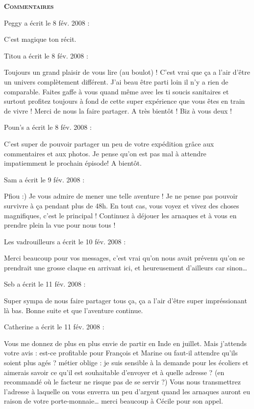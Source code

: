 \bigskip
\textbf{\textsc{Commentaires}}

\medskip
Peggy a écrit le 8 fév. 2008 :
\begin{displayquote}
C'est magique ton récit.
\end{displayquote}

\medskip
Titou a écrit le 8 fév. 2008 :
\begin{displayquote}
Toujours un grand plaisir de vous lire (au boulot) ! C'est vrai que ça a l'air d'être un univers complètement différent. J'ai beau être parti loin il n'y a rien de comparable. Faites gaffe à vous quand même avec les ti soucis sanitaires et surtout profitez toujours à fond de cette super expérience que vous êtes en train de vivre ! Merci de nous la faire partager. A très bientôt ! Biz à vous deux !
\end{displayquote}

\medskip
Poun's a écrit le 8 fév. 2008 :
\begin{displayquote}
C'est super de pouvoir partager un peu de votre expédition grâce aux commentaires et aux photos. Je pense qu'on est pas mal à attendre impatiemment le prochain épisode!
A bientôt.
\end{displayquote}

\medskip
Sam a écrit le 9 fév. 2008 :
\begin{displayquote}
Pfiou :) Je vous admire de mener une telle aventure ! Je ne pense pas pouvoir survivre à ça pendant plus de 48h.
En tout cas, vous voyez et vivez des choses magnifiques, c'est le principal ! Continuez à déjouer les arnaques et à vous en prendre plein la vue pour nous tous !
\end{displayquote}

\medskip
Les vadrouilleurs a écrit le 10 fév. 2008 :
\begin{displayquote}
Merci beaucoup pour vos messages, c'est vrai qu'on nous avait prévenu qu'on se prendrait une grosse claque en arrivant ici, et heureusement d'ailleurs car sinon\dots
\end{displayquote}

\medskip
Seb a écrit le 11 fév. 2008 :
\begin{displayquote}
Super sympa de nous faire partager tous ça, ça a l'air d'être super impréssionant là bas.
Bonne suite et que l'aventure continue.
\end{displayquote}

\medskip
Catherine a écrit le 11 fév. 2008 :
\begin{displayquote}
Vous me donnez de plus en plus envie de partir en Inde en juillet. Mais j'attends votre avis : est-ce profitable pour François et Marine ou faut-il attendre qu'ils soient plus agés ?
métier oblige : je suis sensible à la demande pour les écoliers et aimerais savoir ce qu'il est souhaitable d'envoyer et à quelle adresse ? (en recommandé où le facteur ne risque pas de se servir ?)
Vous nous transmettrez l'adresse à laquelle on vous enverra un peu d'argent quand les arnaques auront eu raison de votre porte-monnaie\dots
merci beaucoup à Cécile pour son appel.
\end{displayquote}

